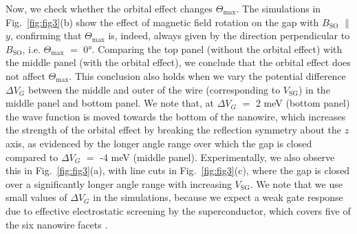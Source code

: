 Now, we check whether the orbital effect changes $\Theta_{\mathrm{max}}$.
The simulations in Fig.~\ref{fig:fig3}(b) show the effect of magnetic field rotation on the gap with $B_{\mathrm{SO}}$ $\parallel$ $y$, confirming that $\Theta_{\mathrm{max}}$ is, indeed, always given by the direction perpendicular to $B_{\mathrm{SO}}$, i.e.  %
$\Theta_{\mathrm{max}}$ $=$ \ang{0}.
Comparing the top panel (without the orbital effect) with the middle panel (with the orbital effect), we conclude that the orbital effect does not affect $\Theta_{\mathrm{max}}$.
This conclusion also holds when we vary the potential difference $\Delta V_G$ between the middle and outer of the wire (corresponding to $V_{\mathrm{SG}}$) in the middle panel and bottom panel.
We note that, at $\Delta V_G$ $=$ 2 meV (bottom panel) the wave function is moved towards the bottom of the nanowire, which increases the strength of the orbital effect by breaking the reflection symmetry about the $z$ axis, as evidenced by the longer angle range over which the gap is closed compared to $\Delta V_G$ $=$ -4 meV (middle panel).
Experimentally, we also observe this in Fig.~\ref{fig:fig3}(a), with line cuts in Fig.~\ref{fig:fig3}(c), where the gap is closed over a significantly longer angle range with increasing $V_{\mathrm{SG}}$.  %
We note that we use small values of $\Delta V_G$ in the simulations, because we expect a weak gate response due to effective electrostatic screening by the superconductor, which covers five of the six nanowire facets \cite{Zhang2017}.

